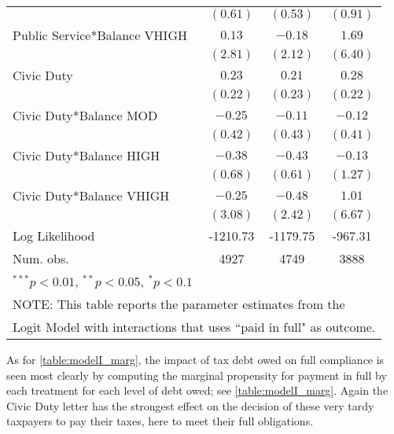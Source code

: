 \documentclass[12pt,titlepage]{article}
\begin{document}
\begin{table}[htbp]
\begin{center}
\begin{tabular}{|l|c|c|c|}
                             & $(0.61)$      & $(0.53)$      & $(0.91)$      \\
Public Service*Balance VHIGH & $0.13$        & $-0.18$       & $1.69$        \\
                             & $(2.81)$      & $(2.12)$      & $(6.40)$      \\
Civic Duty                   & $0.23$        & $0.21$        & $0.28$        \\
                             & $(0.22)$      & $(0.23)$      & $(0.22)$      \\
Civic Duty*Balance MOD       & $-0.25$       & $-0.11$       & $-0.12$       \\
                             & $(0.42)$      & $(0.43)$      & $(0.41)$      \\
Civic Duty*Balance HIGH      & $-0.38$       & $-0.43$       & $-0.13$       \\
                             & $(0.68)$      & $(0.61)$      & $(1.27)$      \\
Civic Duty*Balance VHIGH     & $-0.25$       & $-0.48$       & $1.01$        \\
                             & $(3.08)$      & $(2.42)$      & $(6.67)$      \\
\hline
Log Likelihood               & -1210.73      & -1179.75      & -967.31       \\
Num. obs.                    & 4927          & 4749          & 3888          \\
\hline
\multicolumn{4}{l}{\scriptsize{$^{***}p<0.01$, $^{**}p<0.05$, $^*p<0.1$}} \\
\multicolumn{4}{l}{NOTE: This table reports the parameter estimates from the} \\
\multicolumn{4}{l}{Logit Model with interactions that uses ``paid in full" as outcome.}
\end{tabular}
\label{table:pf_log_II}
\end{center}
\end{table}


As for \ref{table:modelI_marg}, the impact of tax debt owed on full compliance is
seen most clearly by computing the marginal propensity for payment in
full by each treatment for each level of debt owed; see \ref{table:modelI_marg}.
Again the Civic Duty letter has the strongest effect on the decision
of these very tardy taxpayers to pay their taxes, here to meet their
full obligations.
\end{document}
